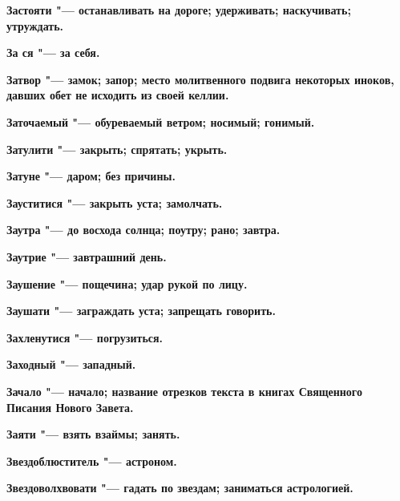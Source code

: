 \begin{multicols}{2}
\bfseries Застояти\normalfont{} "--- останавливать на дороге; удерживать; наскучивать; утруждать. 




\bfseries За ся\normalfont{} "--- за себя. 




\bfseries Затвор\normalfont{} "--- замок; запор; место молитвенного подвига некоторых иноков, давших обет не исходить из своей келлии. 




\bfseries Заточаемый\normalfont{} "--- обуреваемый ветром; носимый; гонимый. 




\bfseries Затулити\normalfont{} "--- закрыть; спрятать; укрыть. 




\bfseries Затуне\normalfont{} "--- даром; без причины. 




\bfseries Зауститися\normalfont{} "--- закрыть уста; замолчать. 




\bfseries Заутра\normalfont{} "--- до восхода солнца; поутру; рано; завтра. 




\bfseries Заутрие\normalfont{} "--- завтрашний день. 




\bfseries Заушение\normalfont{} "--- пощечина; удар рукой по лицу. 




\bfseries Заушати\normalfont{} "--- заграждать уста; запрещать говорить. 




\bfseries Захленутися\normalfont{} "--- погрузиться. 




\bfseries Заходный\normalfont{} "--- западный. 




\bfseries Зачало\normalfont{} "--- начало; название отрезков текста в книгах Священного Писания Нового Завета. 




\bfseries Заяти\normalfont{} "--- взять взаймы; занять. 




\bfseries Звездоблюститель\normalfont{} "--- астроном. 




\bfseries Звездоволхвовати\normalfont{} "--- гадать по звездам; заниматься астрологией. 





\end{multicols}
